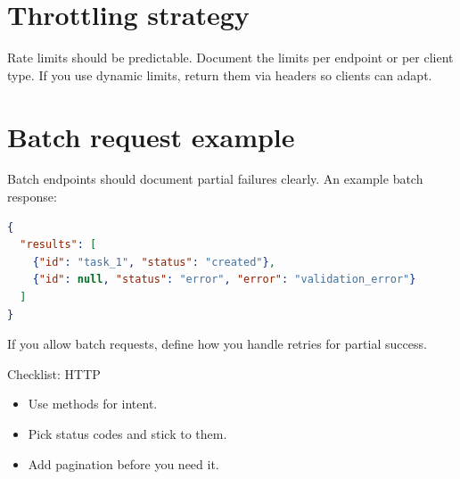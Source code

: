 \section{Throttling strategy}
Rate limits should be predictable.
Document the limits per endpoint or per client type.
If you use dynamic limits, return them via headers so clients can adapt.

\section{Batch request example}
Batch endpoints should document partial failures clearly.
An example batch response:
\begin{lstlisting}[language=JSON]
{
  "results": [
    {"id": "task_1", "status": "created"},
    {"id": null, "status": "error", "error": "validation_error"}
  ]
}
\end{lstlisting}

If you allow batch requests, define how you handle retries for partial success.

\begin{checklistbox}{Checklist: HTTP}
\begin{itemize}[nosep]
  \item Use methods for intent.
  \item Pick status codes and stick to them.
  \item Add pagination before you need it.
\end{itemize}
\end{checklistbox}

